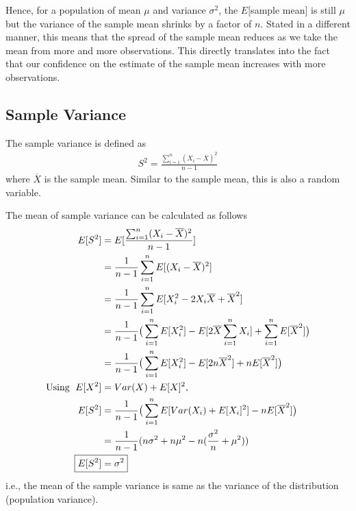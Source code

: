 \documentclass[../probability-notes.tex]{subfiles}
\begin{document}
    Hence, for a population of mean $\mu$ and variance $\sigma^{2}$, the $E[$sample mean$]$ is still $\mu$ but the variance of the sample mean shrinks by a factor of $n$. Stated in a different manner, this means that the spread of the sample mean reduces as we take the mean from more and more observations. This directly translates into the fact that our confidence on the estimate of the sample mean increases with more observations.\newline

    \subsection{Sample Variance}
    The sample variance is defined as
    \begin{align*}
        S^{2} = \frac{\sum_{i=1}^{n} (X_{i} - \overline{X})^{2}}{n - 1}
    \end{align*}
    where $\overline{X}$ is the sample mean. Similar to the sample mean, this is also a random variable.\newline

    The mean of sample variance can be calculated as follows
    \begin{align*}
        E[S^{2}] &= E[\frac{\sum_{i=1}^{n} (X_{i} - \overline{X})^{2}}{n - 1}]\\
        &= \frac{1}{n-1} \sum_{i=1}^{n} E[(X_{i} - \overline{X})^{2}]\\
        &= \frac{1}{n-1} \sum_{i=1}^{n} E[X_{i}^{2} - 2X_{i} \overline{X} + \overline{X}^{2}]\\
        &= \frac{1}{n-1} \big( \sum_{i=1}^{n} E[X_{i}^{2}] - E[2\overline{X} \sum_{i=1}^{n}X_{i}] + \sum_{i=1}^{n}E[\overline{X}^{2}] \big)\\
        &= \frac{1}{n-1} \big( \sum_{i=1}^{n} E[X_{i}^{2}] - E[2n\overline{X}^{2}] + nE[\overline{X}^{2}] \big)\\
        \text{Using \;} E[X^{2}] &= Var(X) + E[X]^{2},\\
        E[S^{2}] &= \frac{1}{n-1} \big( \sum_{i=1}^{n} E[Var(X_{i}) + E[X_{i}]^{2}] - nE[\overline{X}^{2}] \big)\\
        &= \frac{1}{n-1}(n\sigma^{2} + n\mu^{2} - n(\frac{\sigma^{2}}{n} + \mu^{2}))\\
        \Aboxed{E[S^{2}] &= \sigma^{2}}
    \end{align*}
    i.e., the mean of the sample variance is same as the variance of the distribution (population variance).\newline
\end{document}
